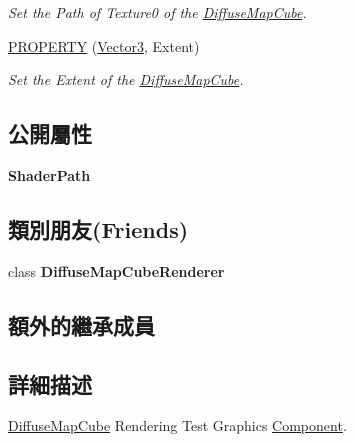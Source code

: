\begin{DoxyCompactItemize}
\begin{DoxyCompactList}\small\item\em Set the Path of Texture0 of the \hyperlink{class_magnum_1_1_diffuse_map_cube}{Diffuse\+Map\+Cube}. \end{DoxyCompactList}\item 
\hyperlink{class_magnum_1_1_diffuse_map_cube_a480856f2521fdd62388b726135b11b6b}{P\+R\+O\+P\+E\+R\+TY} (\hyperlink{class_magnum_1_1_vector3}{Vector3}, Extent)
\begin{DoxyCompactList}\small\item\em Set the Extent of the \hyperlink{class_magnum_1_1_diffuse_map_cube}{Diffuse\+Map\+Cube}. \end{DoxyCompactList}\end{DoxyCompactItemize}
\subsection*{公開屬性}
\begin{DoxyCompactItemize}
\item 
{\bfseries Shader\+Path}\hypertarget{class_magnum_1_1_diffuse_map_cube_a3abe827da1d4794a9da83d1f5ebcf69d}{}\label{class_magnum_1_1_diffuse_map_cube_a3abe827da1d4794a9da83d1f5ebcf69d}

\end{DoxyCompactItemize}
\subsection*{類別朋友(Friends)}
\begin{DoxyCompactItemize}
\item 
class {\bfseries Diffuse\+Map\+Cube\+Renderer}\hypertarget{class_magnum_1_1_diffuse_map_cube_a9e4f5c54ce2a0d71cebda8a92415fcf3}{}\label{class_magnum_1_1_diffuse_map_cube_a9e4f5c54ce2a0d71cebda8a92415fcf3}

\end{DoxyCompactItemize}
\subsection*{額外的繼承成員}


\subsection{詳細描述}
\hyperlink{class_magnum_1_1_diffuse_map_cube}{Diffuse\+Map\+Cube} Rendering Test Graphics \hyperlink{class_magnum_1_1_component}{Component}. 

